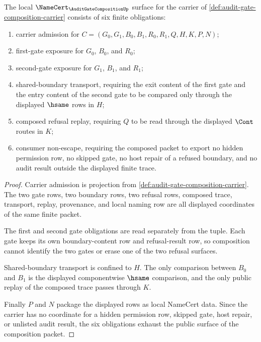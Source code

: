 \begin{theorem}
\label{thm:audit-gate-composition-namecert-obligations}
The local $\NameCert_{\AuditGateCompositionUp}$ surface for the carrier of
\autoref{def:audit-gate-composition-carrier} consists of six finite
obligations:
\begin{enumerate}
\item carrier admission for
$C=(G_0,G_1,B_0,B_1,R_0,R_1,Q,H,K,P,N)$;
\item first-gate exposure for $G_0$, $B_0$, and $R_0$;
\item second-gate exposure for $G_1$, $B_1$, and $R_1$;
\item shared-boundary transport, requiring the exit content of the first gate
and the entry content of the second gate to be compared only through the
displayed $\hsame$ rows in $H$;
\item composed refusal replay, requiring $Q$ to be read through the displayed
$\Cont$ routes in $K$;
\item consumer non-escape, requiring the composed packet to export no hidden
permission row, no skipped gate, no host repair of a refused boundary, and no
audit result outside the displayed finite trace.
\end{enumerate}
\end{theorem}
\begin{proof}
Carrier admission is projection from
\autoref{def:audit-gate-composition-carrier}. The two gate rows, two boundary
rows, two refusal rows, composed trace, transport, replay, provenance, and
local naming row are all displayed coordinates of the same finite packet.

The first and second gate obligations are read separately from the tuple.
Each gate keeps its own boundary-content row and refusal-result row, so
composition cannot identify the two gates or erase one of the two refusal
surfaces.

Shared-boundary transport is confined to $H$. The only comparison between
$B_0$ and $B_1$ is the displayed componentwise $\hsame$ comparison, and the
only public replay of the composed trace passes through $K$.

Finally $P$ and $N$ package the displayed rows as local NameCert data. Since
the carrier has no coordinate for a hidden permission row, skipped gate, host
repair, or unlisted audit result, the six obligations exhaust the public
surface of the composition packet.
\end{proof}

